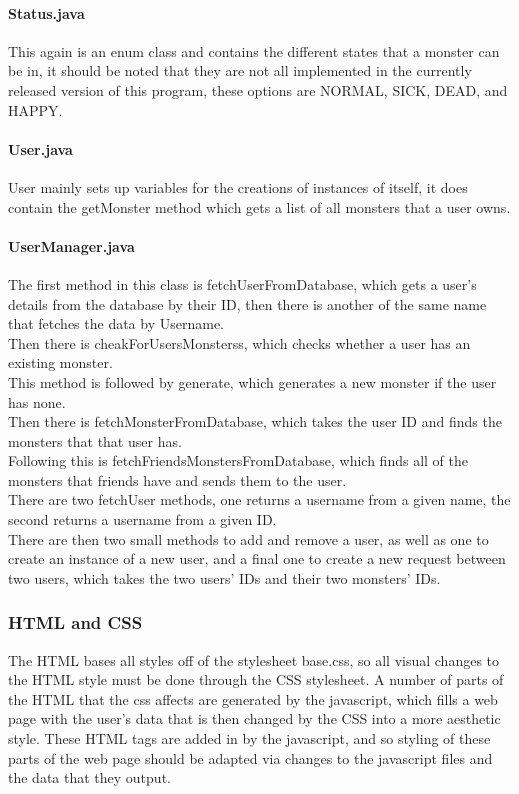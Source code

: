 \documentclass{project}
\begin{document}
\paragraph{Status.java}
This again is an enum class and contains the different states that a monster can be in, it should be noted that they are not all implemented in the currently released version of this program, these options are NORMAL, SICK, DEAD, and HAPPY.
\paragraph{User.java}
User mainly sets up variables for the creations of instances of itself, it does contain the getMonster method which gets a list of all monsters that a user owns.
\paragraph{UserManager.java}
The first method in this class is fetchUserFromDatabase, which gets a user's details from the database by their ID, then there is another of the same name that fetches the data by Username.\\
Then there is cheakForUsersMonsterss, which checks whether a user has an existing monster.\\
This method is followed by generate, which generates a new monster if the user has none.\\
Then there is fetchMonsterFromDatabase, which takes the user ID and finds the monsters that that user has.\\
Following this is fetchFriendsMonstersFromDatabase, which finds all of the monsters that friends have and sends them to the user.\\
There are two fetchUser methods, one returns a username from a given name, the second returns a username from a given ID.\\
There are then two small methods to add and remove a user, as well as one to create an instance of a new user, and a final one to create a new request between two users, which takes the two users' IDs and their two monsters' IDs.

\subsubsection{HTML and CSS}The HTML bases all styles off of the stylesheet base.css, so all visual changes to the HTML style must be done through the CSS stylesheet. A number of parts of the HTML that the css affects are generated by the javascript, which fills a web page with the user's data that is then changed by the CSS into a more aesthetic style. These HTML tags are added in by the javascript, and so styling of these parts of the web page should be adapted via changes to the javascript files and the data that they output.
\end{document}
